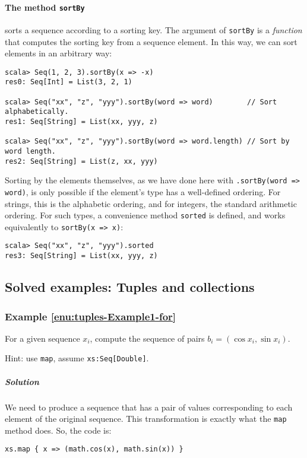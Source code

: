 \paragraph*{The method \texttt{sortBy}}

sorts a sequence according to a sorting key. The argument of \lstinline!sortBy!
is a \emph{function} that computes the sorting key from a sequence
element. In this way, we can sort elements in an arbitrary way:
\begin{lstlisting}
scala> Seq(1, 2, 3).sortBy(x => -x)
res0: Seq[Int] = List(3, 2, 1)

scala> Seq("xx", "z", "yyy").sortBy(word => word)        // Sort alphabetically.
res1: Seq[String] = List(xx, yyy, z)

scala> Seq("xx", "z", "yyy").sortBy(word => word.length) // Sort by word length.
res2: Seq[String] = List(z, xx, yyy)
\end{lstlisting}
Sorting by the elements themselves, as we have done here with \lstinline!.sortBy(word => word)!,
is only possible if the element\textsf{'}s type has a well-defined ordering.
For strings, this is the alphabetic ordering, and for integers, the
standard arithmetic ordering. For such types, a convenience method
\lstinline!sorted! is defined, and works equivalently to \lstinline!sortBy(x => x)!:
\begin{lstlisting}
scala> Seq("xx", "z", "yyy").sorted
res3: Seq[String] = List(xx, yyy, z)
\end{lstlisting}


\subsection{Solved examples: Tuples and collections}

\subsubsection{Example \label{enu:tuples-Example1-for}\ref{enu:tuples-Example1-for}}

For a given sequence $x_{i}$, compute the sequence of pairs $b_{i}=\left(\cos x_{i},\sin x_{i}\right)$.

Hint: use \lstinline!map!, assume \lstinline!xs:Seq[Double]!.

\subparagraph{Solution}

We need to produce a sequence that has a pair of values corresponding
to each element of the original sequence. This transformation is exactly
what the \lstinline!map! method does. So, the code is:
\begin{lstlisting}
xs.map { x => (math.cos(x), math.sin(x)) }
\end{lstlisting}



